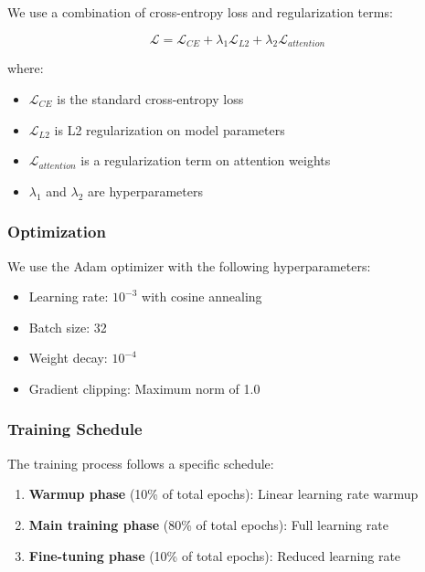 We use a combination of cross-entropy loss and regularization terms:

\begin{equation}
\mathcal{L} = \mathcal{L}_{CE} + \lambda_1 \mathcal{L}_{L2} + \lambda_2 \mathcal{L}_{attention}
\end{equation}

where:
\begin{itemize}
    \item $\mathcal{L}_{CE}$ is the standard cross-entropy loss
    \item $\mathcal{L}_{L2}$ is L2 regularization on model parameters
    \item $\mathcal{L}_{attention}$ is a regularization term on attention weights
    \item $\lambda_1$ and $\lambda_2$ are hyperparameters
\end{itemize}

\subsubsection{Optimization}

We use the Adam optimizer with the following hyperparameters:

\begin{itemize}
    \item Learning rate: $10^{-3}$ with cosine annealing
    \item Batch size: 32
    \item Weight decay: $10^{-4}$
    \item Gradient clipping: Maximum norm of 1.0
\end{itemize}

\subsubsection{Training Schedule}

The training process follows a specific schedule:

\begin{enumerate}
    \item \textbf{Warmup phase} (10\% of total epochs): Linear learning rate warmup
    \item \textbf{Main training phase} (80\% of total epochs): Full learning rate
    \item \textbf{Fine-tuning phase} (10\% of total epochs): Reduced learning rate
\end{enumerate}

